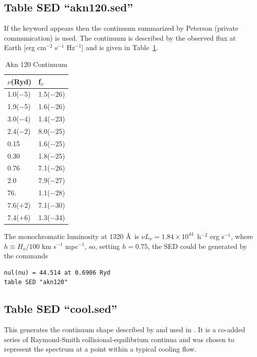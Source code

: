 \subsection{Table SED ``akn120.sed''}

\noindent If the keyword  appears then the continuum
summarized by Peterson (private communication) is used.
The continuum is described by the observed flux
at Earth [erg cm$^{-2}$ s$^{-1}$ Hz$^{-1}$] and is given in
Table~\ref{tab:Akn120Continuum}.

\begin{table}
\centering
\caption{{Akn 120 Continuum}}
\label{tab:Akn120Continuum}
\begin{tabular}{ll}\hline
$\nu$(Ryd)& f$_\nu$\\
\hline
1.0($-$5)& 1.5($-$26)\\
1.9($-$5)& 1.6($-$26)\\
3.0($-$4)& 1.4($-$23)\\
2.4($-$2)& 8.0($-$25)\\
0.15& 1.6($-$25)\\
0.30& 1.8($-$25)\\
0.76& 7.1($-$26)\\
2.0&  7.9($-$27)\\
76.&  1.1($-$28)\\
7.6($+$2)& 7.1($-$30)\\
7.4($+$6)& 1.3($-$34)\\
\hline
\end{tabular}
\end{table}

The monochromatic luminosity at 1320 \AA\  is
$\nu L_\nu=1.84 \times 10^{44}$~h$^{-2}$ erg s$^{-1}$,
where
$h\equiv H_o/100$ km s$^{-1}$ mpc$^{-1}$, so, setting $h = 0.75$,
the  SED
could be generated by the commands
\begin{verbatim}
nul(nu) = 44.514 at 0.6906 Ryd
table SED "akn120"
\end{verbatim}

\subsection{Table SED ``cool.sed'' }

This generates the continuum shape
described by \citet{Johnstone1992} and used in \citet{Ferland1994,FerlandFabian2002}.  It
is a co-added series of Raymond-Smith collisional-equilibrium continua and
was chosen to represent the spectrum at a point within a typical cooling
flow.

